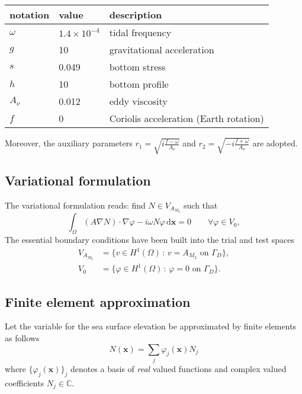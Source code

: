 \documentclass[11pt,a4paper]{article}
\begin{document}
\begin{center}
\begin{tabular}{|l|l|l|}
\hline
notation & value & description\\
\hline
$\omega$ & $1.4\times 10^{-4}$ &tidal frequency\\
$g$ & 10 & gravitational acceleration\\
$s$ & 0.049 & bottom stress\\
$h$ & 10 & bottom profile\\
$A_\nu$ & 0.012 & eddy viscosity\\
$f$ & 0 & Coriolis acceleration (Earth rotation)\\
\hline
\end{tabular}
\end{center}
Moreover, the auxiliary parameters $r_1=\sqrt{i\frac{f-\omega}{A_\nu}}$ and $r_2=\sqrt{-i\frac{f+\omega}{A_\nu}}$ are adopted.

\subsection{Variational formulation}
The variational formulation reads: find $N\in V_{A_{M_2}}$ such that
\begin{equation}
\int_\Omega(A\nabla N)\cdot\nabla \varphi- i\omega N \varphi\,\mathrm{d}\mathbf{x}=0\qquad \forall \varphi\in V_0,
\end{equation}
The essential boundary conditions have been built into the trial and test spaces
\begin{align}
V_{A_{M_2}}&=\{v\in H^1(\Omega)\,:\, v=A_{M_2}\text{ on }\Gamma_D\},\\
V_0&=\{\varphi\in H^1(\Omega)\,:\, \varphi=0\text{ on }\Gamma_D\}.
\end{align}

\subsection{Finite element approximation}
Let the variable for the sea surface elevation be approximated by finite elements as follows
\begin{equation}
N(\mathbf{x})=\sum_{j}\varphi_j(\mathbf{x})N_j 
\end{equation}
where $\{\varphi_j(\mathbf{x})\}_j$ denotes a basis of \emph{real} valued functions and complex valued coefficients $N_j\in\mathbb{C}$.
\end{document}
